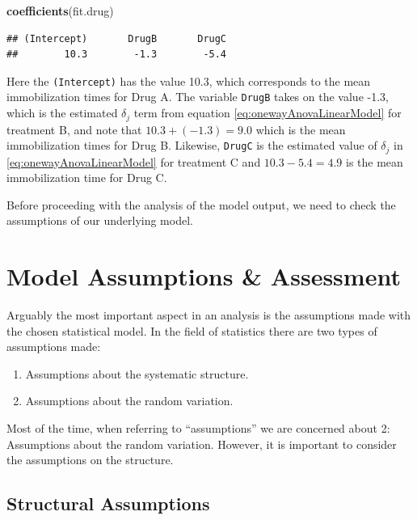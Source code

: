 \documentclass[
]{book}
\newenvironment{Shaded}{\begin{snugshade}}{\end{snugshade}}
\newcommand{\FunctionTok}[1]{\textcolor[rgb]{0.13,0.29,0.53}{\textbf{#1}}}
\newcommand{\NormalTok}[1]{#1}
\providecommand{\tightlist}{%
  \setlength{\itemsep}{0pt}\setlength{\parskip}{0pt}}
\begin{document}
\begin{Shaded}
\begin{Highlighting}[]
\FunctionTok{coefficients}\NormalTok{(fit.drug)}
\end{Highlighting}
\end{Shaded}

\begin{verbatim}
## (Intercept)       DrugB       DrugC 
##        10.3        -1.3        -5.4
\end{verbatim}

Here the \texttt{(Intercept)} has the value 10.3, which corresponds to the mean immobilization times for Drug A.
The variable \texttt{DrugB} takes on the value -1.3, which is the estimated \(\delta_j\) term from equation \eqref{eq:onewayAnovaLinearModel} for treatment B, and note that \(10.3 + (-1.3) = 9.0\) which is the mean immobilization times for Drug B.
Likewise, \texttt{DrugC} is the estimated value of \(\delta_j\) in \eqref{eq:onewayAnovaLinearModel} for treatment C and \(10.3 - 5.4 = 4.9\) is the mean immobilization time for Drug C.

Before proceeding with the analysis of the model output, we need to check the assumptions of our underlying model.

\hypertarget{assumptionCheck}{%
\section{Model Assumptions \& Assessment}\label{assumptionCheck}}

Arguably the most important aspect in an analysis is the assumptions made with the chosen statistical model.
In the field of statistics there are two types of assumptions made:

\begin{enumerate}
\def\labelenumi{\arabic{enumi}.}
\tightlist
\item
  Assumptions about the systematic structure.
\item
  Assumptions about the random variation.
\end{enumerate}

Most of the time, when referring to ``assumptions'' we are concerned about 2: Assumptions about the random variation.
However, it is important to consider the assumptions on the structure.

\hypertarget{structural-assumptions}{%
\subsection{Structural Assumptions}\label{structural-assumptions}}
\end{document}
